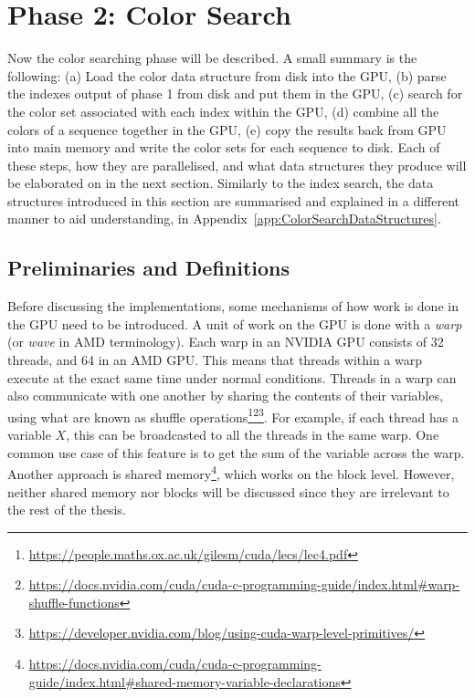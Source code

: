 \section{Phase 2:  Color Search}

Now the color searching phase will be described.
A small summary is the following: (a) Load the color data structure from disk into the GPU, (b) parse the indexes output of phase 1 from disk and put them in the GPU, (c) search for the color set associated with each index within the GPU, (d) combine all the colors of a sequence together in the GPU, (e) copy the results back from GPU into main memory and write the color sets for each sequence to disk.
Each of these steps, how they are parallelised, and what data structures they produce will be elaborated on in the next section.
Similarly to the index search, the data structures introduced in this section are summarised and explained in a different manner to aid understanding, in Appendix~\ref{app:ColorSearchDataStructures}.

\subsection{Preliminaries and Definitions}

Before discussing the implementations, some mechanisms of how work is done in the GPU need to be introduced.
A unit of work on the GPU is done with a \textit{warp} (or \textit{wave} in AMD terminology).
Each warp in an NVIDIA GPU consists of 32 threads, and 64 in an AMD GPU.
This means that threads within a warp execute at the exact same time under normal conditions.
Threads in a warp can also communicate with one another by sharing the contents of their variables, using what are known as shuffle operations\footnote{\url{https://people.maths.ox.ac.uk/gilesm/cuda/lecs/lec4.pdf}}\footnote{\url{https://docs.nvidia.com/cuda/cuda-c-programming-guide/index.html#warp-shuffle-functions}}\footnote{\url{https://developer.nvidia.com/blog/using-cuda-warp-level-primitives/}}.
For example, if each thread has a variable $X$, this can be broadcasted to all the threads in the same warp.
One common use case of this feature is to get the sum of the variable across the warp.
Another approach is shared memory\footnote{\url{https://docs.nvidia.com/cuda/cuda-c-programming-guide/index.html#shared-memory-variable-declarations}}, which works on the block level.
However, neither shared memory nor blocks will be discussed since they are irrelevant to the rest of the thesis.

